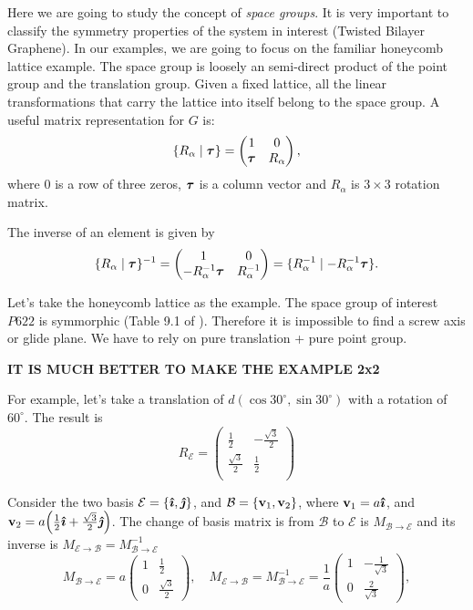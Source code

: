 Here we are going to study the concept of \textit{space groups}. It is very important to classify the symmetry properties of the system in interest (Twisted Bilayer Graphene). In our examples, we are going to focus on the familiar honeycomb lattice example. The space group is loosely an semi-direct product of the point group and the translation group. Given a fixed lattice, all the linear transformations that carry the lattice into itself belong to the space group. A useful matrix representation for $G$ is:
\begin{equation} \label{eq:spacegroup-rep}
\{ R_\alpha \mid {\bm{\tau}} \} =
\begin{pmatrix}
1 & 0 \\
{\bm{\tau}} & R_\alpha
\end{pmatrix},
\end{equation}
where $0$ is a row of three zeros, ${\bm{\tau}}$ is a column vector and $R_\alpha$ is $3\times 3$ rotation matrix.

The inverse of an element is given by
\begin{equation} \label{eq:inv-spacegroup}
\{ R_\alpha \mid {\bm{\tau}} \}^{-1} =
\begin{pmatrix}
1 & 0 \\
-R_\alpha^{-1}{\bm{\tau}} & R_\alpha^{-1}
\end{pmatrix} =
\{ R_\alpha^{-1} \mid -R_\alpha^{-1}{\bm{\tau}} \}.
\end{equation}

Let's take the honeycomb lattice as the example. The space group of interest $P622$ \cite{thesis_rennella} is symmorphic (Table 9.1 of \cite{dresselhaus}). Therefore it is impossible to find a screw axis or glide plane. We have to rely on pure translation + pure point group.

\textbf{IT IS MUCH BETTER TO MAKE THE EXAMPLE 2x2}

For example, let's take a translation of $d(\cos30^\circ, \sin30^\circ)$ with a rotation of $60^\circ$. The result is
$$
R_{\mathcal{E}} =
\begin{pmatrix}
\frac{1}{2} & -\frac{\sqrt{3}}{2} \\
\frac{\sqrt{3}}{2} & \frac{1}{2} \\
\end{pmatrix}
$$

Consider the two basis $\mathcal{E} = \{\bm{\hat{\imath}}, \bm{\hat{\jmath}}\}$, and $\mathcal{B} = \{{\vb{v}}_1, {\vb{v}}_2\}$, where ${\vb{v}}_1 = a \bm{\hat{\imath}}$, and ${\vb{v}}_2 = a \qty(\frac{1}{2}\bm{\hat{\imath}} + \frac{\sqrt{3}}{2} \bm{\hat{\jmath}})$. The change of basis matrix is from $\mathcal{B}$ to $\mathcal{E}$ is $M_{\mathcal{B}\to\mathcal{E}}$ and its inverse is $M_{\mathcal{E}\to\mathcal{B}} = M_{\mathcal{B}\to\mathcal{E}}^{-1}$
$$
M_{\mathcal{B} \to \mathcal{E}} =
a
\begin{pmatrix}
1 & \frac{1}{2} \\
0 & \frac{\sqrt{3}}{2}
\end{pmatrix},
\quad
M_{\mathcal{E} \to \mathcal{B}} = M_{\mathcal{B}\to\mathcal{E}}^{-1} =
\frac{1}{a}
\begin{pmatrix}
1 & -\frac{1}{\sqrt{3}} \\
0 & \frac{2}{\sqrt{3}}
\end{pmatrix},
$$

